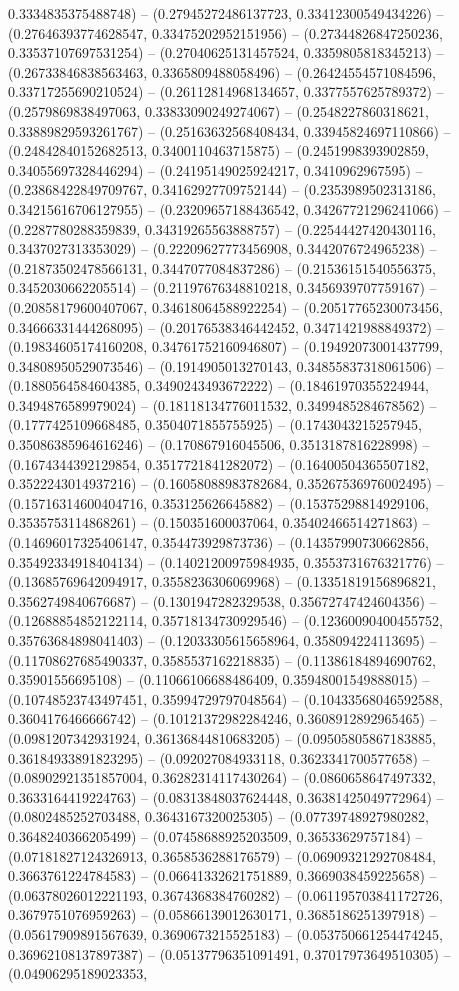 0.3334835375488748) -- (0.27945272486137723, 0.33412300549434226) -- (0.27646393774628547, 0.33475202952151956) -- (0.27344826847250236, 0.33537107697531254) -- (0.27040625131457524, 0.3359805818345213) -- (0.26733846838563463, 0.3365809488058496) -- (0.26424554571084596, 0.33717255690210524) -- (0.26112814968134657, 0.3377557625789372) -- (0.2579869838497063, 0.33833090249274067) -- (0.2548227860318621, 0.33889829593261767) -- (0.25163632568408434, 0.33945824697110866) -- (0.24842840152682513, 0.3400110463715875) -- (0.2451998393902859, 0.34055697328446294) -- (0.24195149025924217, 0.3410962967595) -- (0.23868422849709767, 0.34162927709752144) -- (0.2353989502313186, 0.34215616706127955) -- (0.23209657188436542, 0.34267721296241066) -- (0.2287780288359839, 0.34319265563888757) -- (0.22544427420430116, 0.3437027313353029) -- (0.22209627773456908, 0.3442076724965238) -- (0.21873502478566131, 0.3447077084837286) -- (0.21536151540556375, 0.3452030662205514) -- (0.21197676348810218, 0.3456939707759167) -- (0.20858179600407067, 0.34618064588922254) -- (0.20517765230073456, 0.34666331444268095) -- (0.20176538346442452, 0.3471421988849372) -- (0.19834605174160208, 0.34761752160946807) -- (0.19492073001437799, 0.34808950529073546) -- (0.1914905013270143, 0.34855837318061506) -- (0.1880564584604385, 0.3490243493672222) -- (0.18461970355224944, 0.3494876589979024) -- (0.18118134776011532, 0.3499485284678562) -- (0.1777425109668485, 0.3504071855755925) -- (0.1743043215257945, 0.35086385964616246) -- (0.170867916045506, 0.3513187816228998) -- (0.1674344392129854, 0.3517721841282072) -- (0.16400504365507182, 0.3522243014937216) -- (0.16058088983782684, 0.35267536976002495) -- (0.15716314600404716, 0.353125626645882) -- (0.15375298814929106, 0.3535753114868261) -- (0.150351600037064, 0.35402466514271863) -- (0.14696017325406147, 0.354473929873736) -- (0.14357990730662856, 0.35492334918404134) -- (0.14021200975984935, 0.3553731676321776) -- (0.13685769642094917, 0.3558236306069968) -- (0.13351819156896821, 0.3562749840676687) -- (0.1301947282329538, 0.35672747424604356) -- (0.12688854852122114, 0.35718134730929546) -- (0.12360090400455752, 0.35763684898041403) -- (0.12033305615658964, 0.358094224113695) -- (0.11708627685490337, 0.3585537162218835) -- (0.11386184894690762, 0.35901556695108) -- (0.11066106688486409, 0.35948001549888015) -- (0.10748523743497451, 0.35994729797048564) -- (0.10433568046592588, 0.3604176466666742) -- (0.10121372982284246, 0.3608912892965465) -- (0.0981207342931924, 0.36136844810683205) -- (0.09505805867183885, 0.36184933891823295) -- (0.092027084933118, 0.3623341700577658) -- (0.08902921351857004, 0.36282314117430264) -- (0.0860658647497332, 0.3633164419224763) -- (0.08313848037624448, 0.36381425049772964) -- (0.0802485252703488, 0.3643167320025305) -- (0.07739748927980282, 0.3648240366205499) -- (0.07458688925203509, 0.36533629757184) -- (0.07181827124326913, 0.3658536288176579) -- (0.06909321292708484, 0.3663761224784583) -- (0.06641332621751889, 0.3669038459225658) -- (0.06378026012221193, 0.3674368384760282) -- (0.061195703841172726, 0.3679751076959263) -- (0.05866139012630171, 0.3685186251397918) -- (0.05617909891567639, 0.3690673215525183) -- (0.053750661254474245, 0.36962108137897387) -- (0.05137796351091491, 0.37017973649510305) -- (0.04906295189023353, 
